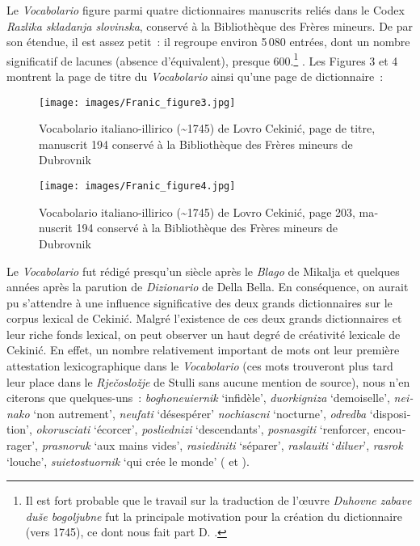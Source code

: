 \documentclass[output=paper,colorlinks,citecolor=brown,arabicfont,chinesefont,booklanguage=french]{langscibook}
\begin{document}
\begin{otherlanguage}{french}
Le \emph{Vocabolario} figure parmi quatre dictionnaires manuscrits reliés dans le Codex \emph{Razlika skladanja slovinska}, conservé à la Bibliothèque des Frères mineurs. De par son étendue, il est assez petit~: il regroupe environ 5\,080 entrées, dont un nombre significatif de lacunes (absence d’équivalent), presque 600.\footnote{Il est fort probable que le travail sur la traduction de l’œuvre \emph{Duhovne zabave duše bogoljubne} fut la principale motivation pour la création du dictionnaire (vers 1745), ce dont nous fait part D. \citet[269]{Berić1956}.} .  Les Figures 3 et 4 montrent la page de titre du \emph{Vocabolario} ainsi qu’une page de dictionnaire~:

\begin{figure}
\texttt{[image: images/Franic\_figure3.jpg]}
\caption{Vocabolario italiano-illirico (\~{}1745) de Lovro Cekinić, page de titre, manuscrit 194 conservé à la Bibliothèque des Frères mineurs de Dubrovnik}
\label{Figure 3}
\end{figure}

\begin{figure}
\texttt{[image: images/Franic\_figure4.jpg]}
\caption{Vocabolario italiano-illirico (\~{}1745) de Lovro Cekinić, page 203, manuscrit 194 conservé à la Bibliothèque des Frères mineurs de Dubrovnik}
\label{Figure 4}
\end{figure}

Le \emph{Vocabolario} fut rédigé presqu’un siècle après le \emph{Blago} de Mikalja et quelques années après la parution de \emph{Dizionario} de Della Bella. En conséquence, on aurait pu s’attendre à une influence significative des deux grands dictionnaires sur le corpus lexical de Cekinić. Malgré l'existence de ces deux grands dictionnaires et leur riche fonds lexical, on peut observer un haut degré de créativité lexicale de Cekinić. En effet, un nombre relativement important de mots ont leur première attestation lexicographique dans le \emph{Vocabolario} (ces mots trouveront plus tard leur place dans le \emph{Rječosložje} de Stulli sans aucune mention de source), nous n’en citerons que quelques-uns~: \emph{boghoneuiernik} ‘infidèle’, \emph{duorkigniza} ‘demoiselle’, \emph{neinako} ‘non autrement’, \emph{neufati} ‘désespérer’ \emph{nochiascni} ‘nocturne’, \emph{odredba} ‘disposition’, \emph{okorusciati} ‘écorcer’, \emph{posliednizi} ‘descendants’, \emph{posnasgiti} ‘renforcer, encourager’, \emph{prasnoruk} ‘aux mains vides’, \emph{rasiediniti} ‘séparer’, \emph{raslauiti} ‘\emph{diluer}’, \emph{rasrok} ‘louche’, \emph{suietostuornik} ‘qui crée le monde’ (\citealt{Franic2007} et \citealt{Franic2008}).


\end{otherlanguage}
\end{document}
